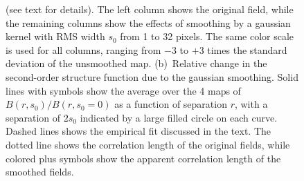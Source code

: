 \documentclass[fleqn,usenatbib, useAMS, a4paper]{mnras}
\begin{document}
\begin{figure}
{    (see text for details).
    The left column shows the original field,
    while the remaining columns show the effects of smoothing by a gaussian kernel
    with RMS width \(s_0\) from 1 to 32 pixels.
    The same color scale is used for all columns, ranging from \(-3\) to \(+3\) times
    the standard deviation of the unsmoothed map.
    (b)~Relative change in the second-order structure function due to the gaussian smoothing.
    Solid lines with symbols show the average over the 4 maps of
    \(B(r, s_0) / B(r, s_0 = 0)\) as a function of separation \(r\),
    with a separation of \(2 s_0\) indicated by a large filled circle on each curve.
    Dashed lines shows the empirical fit discussed in the text.
    The dotted line shows the correlation length of the original fields,
    while colored plus symbols show the apparent correlation length of the smoothed fields.
  }
  \label{fig:seeing-reduction}
\end{figure}



\bsp	%
\label{lastpage}
\end{document}
